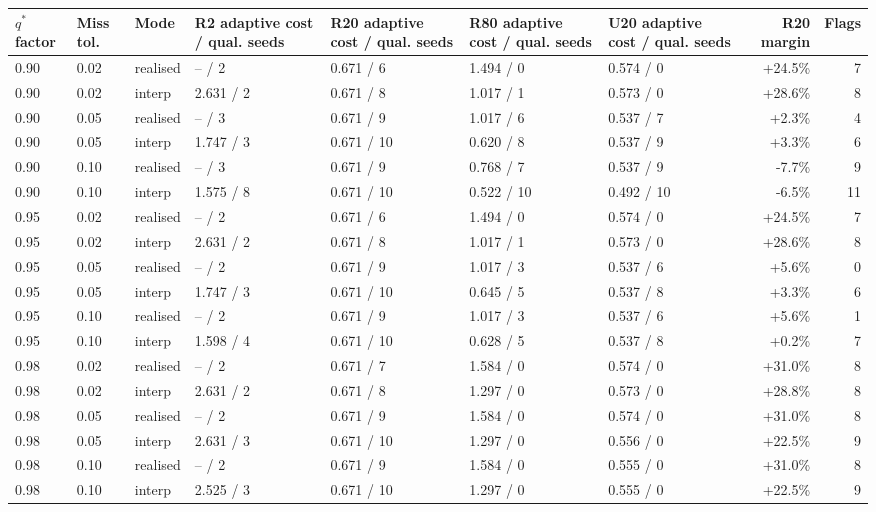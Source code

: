 \begin{tabular}{lllllllrr}
\hline
$q^*$ factor & Miss tol. & Mode & R2 adaptive cost / qual. seeds & R20 adaptive cost / qual. seeds & R80 adaptive cost / qual. seeds & U20 adaptive cost / qual. seeds & R20 margin & Flags \\
\hline
0.90 & 0.02 & realised & -- / 2 & 0.671 / 6 & 1.494 / 0 & 0.574 / 0 & +24.5\% & 7 \\
0.90 & 0.02 & interp & 2.631 / 2 & 0.671 / 8 & 1.017 / 1 & 0.573 / 0 & +28.6\% & 8 \\
0.90 & 0.05 & realised & -- / 3 & 0.671 / 9 & 1.017 / 6 & 0.537 / 7 & +2.3\% & 4 \\
0.90 & 0.05 & interp & 1.747 / 3 & 0.671 / 10 & 0.620 / 8 & 0.537 / 9 & +3.3\% & 6 \\
0.90 & 0.10 & realised & -- / 3 & 0.671 / 9 & 0.768 / 7 & 0.537 / 9 & -7.7\% & 9 \\
0.90 & 0.10 & interp & 1.575 / 8 & 0.671 / 10 & 0.522 / 10 & 0.492 / 10 & -6.5\% & 11 \\
0.95 & 0.02 & realised & -- / 2 & 0.671 / 6 & 1.494 / 0 & 0.574 / 0 & +24.5\% & 7 \\
0.95 & 0.02 & interp & 2.631 / 2 & 0.671 / 8 & 1.017 / 1 & 0.573 / 0 & +28.6\% & 8 \\
0.95 & 0.05 & realised & -- / 2 & 0.671 / 9 & 1.017 / 3 & 0.537 / 6 & +5.6\% & 0 \\
0.95 & 0.05 & interp & 1.747 / 3 & 0.671 / 10 & 0.645 / 5 & 0.537 / 8 & +3.3\% & 6 \\
0.95 & 0.10 & realised & -- / 2 & 0.671 / 9 & 1.017 / 3 & 0.537 / 6 & +5.6\% & 1 \\
0.95 & 0.10 & interp & 1.598 / 4 & 0.671 / 10 & 0.628 / 5 & 0.537 / 8 & +0.2\% & 7 \\
0.98 & 0.02 & realised & -- / 2 & 0.671 / 7 & 1.584 / 0 & 0.574 / 0 & +31.0\% & 8 \\
0.98 & 0.02 & interp & 2.631 / 2 & 0.671 / 8 & 1.297 / 0 & 0.573 / 0 & +28.8\% & 8 \\
0.98 & 0.05 & realised & -- / 2 & 0.671 / 9 & 1.584 / 0 & 0.574 / 0 & +31.0\% & 8 \\
0.98 & 0.05 & interp & 2.631 / 3 & 0.671 / 10 & 1.297 / 0 & 0.556 / 0 & +22.5\% & 9 \\
0.98 & 0.10 & realised & -- / 2 & 0.671 / 9 & 1.584 / 0 & 0.555 / 0 & +31.0\% & 8 \\
0.98 & 0.10 & interp & 2.525 / 3 & 0.671 / 10 & 1.297 / 0 & 0.555 / 0 & +22.5\% & 9 \\
\hline
\end{tabular}
